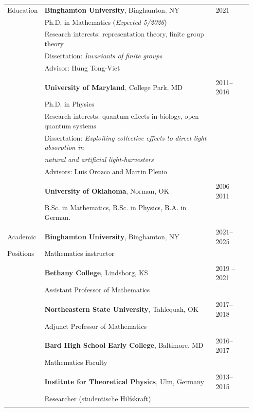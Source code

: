 \documentclass[letterpaper,12pt,oneside]{article}
\begin{document}
\noindent \begin{longtable}{p{0.15\linewidth}p{0.7\linewidth}p{0.15\linewidth}}
 \large{Education}    & \textbf{Binghamton University}, Binghamton, NY & 2021-- \\
     & Ph.D. in Mathematics (\emph{Expected 5/2026}) %
     & \\
     & Research interests: representation theory, finite group theory & \\
     & Dissertation: \emph{Invariants of finite groups} &\\
     & Advisor: Hung Tong-Viet & \\
     & \\
    & \textbf{University of Maryland}, College Park, MD & 2011--2016 \\
     & Ph.D. in Physics & \\ %
     & Research interests: quantum effects in biology, open quantum systems & \\
     & Dissertation: \emph{Exploiting collective effects to direct light absorption in} \\& \quad \emph{natural and artificial light-harvesters} & \\
     & Advisors: Luis Orozco and Martin Plenio & \\
     & \\
     & \textbf{University of Oklahoma}, Norman, OK & 2006--2011 \\
     & B.Sc. in Mathematics, B.Sc. in Physics, B.A. in German. & \\ %
    & &\\
  \large{Academic}   & \textbf{Binghamton University}, Binghamton, NY  & 2021--2025  \\
  \large{Positions}  & Mathematics instructor  & \\
     & & \\

     & \textbf{Bethany College}, Lindsborg, KS & 2019 -- 2021  \\
     & Assistant Professor of Mathematics & \\
     & & \\
     
     &\textbf{Northeastern State University}, Tahlequah, OK & 2017--2018\\
     & Adjunct Professor of Mathematics & \\
     & & \\
     & \textbf{Bard High School Early College}, Baltimore, MD & 2016--2017 \\
     & Mathematics Faculty & \\
     & &\\
     & \textbf{Institute for Theoretical Physics}, Ulm, Germany & 2013--2015 \\
     & Researcher (studentische Hilfskraft) & \\
    &&\\


\end{longtable}
\end{document}
